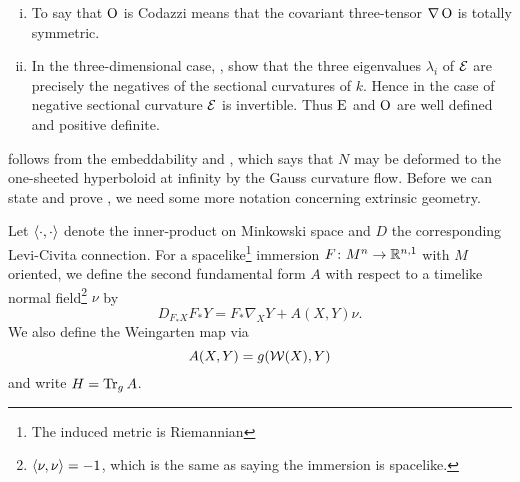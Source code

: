 \documentclass[a4paper,12pt]{amsart}
\begin{document}
\begin{rem}
\begin{enumerate}[(i)]
\item To say that \(\operatorname{O}\) is Codazzi means that the covariant three-tensor \(\nabla \operatorname{O}\) is totally symmetric.
\item In the three-dimensional case, \cite{MR2055396}, show that the three eigenvalues $\lambda_{i}$ of $\operatorname{\mathcal{E}}$ are precisely the negatives of the sectional curvatures of \(k\). Hence in the case of negative sectional curvature \(\operatorname{\mathcal{E}}\) is invertible. Thus \(\operatorname{E}\) and \(\operatorname{O}\) are well defined and positive definite.
\end{enumerate}
\end{rem}

 follows from the embeddability  and \cite[Theorem 1.1]{MR3344442}, which says that \(N\) may be deformed to the one-sheeted hyperboloid at infinity by the Gauss curvature flow.
Before we can state and prove , we need some more notation concerning extrinsic geometry.

Let \(\left\langle \cdot,\cdot \right\rangle\) denote the inner-product on Minkowski space and \(D\) the corresponding Levi-Civita connection. For a spacelike\footnote{The induced metric is Riemannian} immersion \(F\colon M^n \to \mathbb{R}^{n,1}\) with \(M\) oriented, we define the second fundamental form $A$ with respect to a timelike normal field\footnote{\(\left\langle \nu,\nu \right\rangle=-1\), which is the same as saying the immersion is spacelike.} $\nu$ by
\[
D_{F_{\ast} X} F_{\ast} Y = F_{\ast} \nabla_X Y + A(X,Y)\nu.
\]
We also define the Weingarten map via
\[
A(X, Y) =  g(\operatorname{\mathcal{W}}(X), Y)
\] 
and write $H=\operatorname{Tr}_{g}A$.
\end{document}
